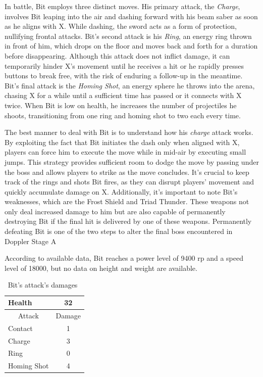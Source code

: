 In battle, Bit employs three distinct moves. His primary attack, the \emph{Charge}, involves Bit leaping into the air and dashing forward with his beam saber as soon as he aligns with X. While dashing, the sword acts as a form of protection, nullifying frontal attacks. Bit's second attack is his \emph{Ring}, an energy ring thrown in front of him, which drops on the floor and moves back and forth for a duration before disappearing. Although this attack does not inflict damage, it can temporarily hinder X's movement until he receives a hit or he rapidly presses buttons to break free, with the risk of enduring a follow-up in the meantime. Bit's final attack is the \emph{Homing Shot}, an energy sphere he throws into the arena, chasing X for a while until a sufficient time has passed or it connects with X twice. When Bit is low on health, he increases the number of projectiles he shoots, transitioning from one ring and homing shot to two each every time.


The best manner to deal with Bit is to understand how his \emph{charge} attack works. By exploiting the fact that Bit initiates the dash only when aligned with X, players can force him to execute the move while in mid-air by executing small jumps. This strategy provides sufficient room to dodge the move by passing under the boss and allows players to strike as the move concludes. It's crucial to keep track of the rings and shots Bit fires, as they can disrupt players' movement and quickly accumulate damage on X. Additionally, it's important to note Bit's weaknesses, which are the Frost Shield and Triad Thunder. These weapons not only deal increased damage to him but are also capable of permanently destroying Bit if the final hit is delivered by one of these weapons. Permanently defeating Bit is one of the two steps to alter the final boss encountered in Doppler Stage A

According to available data, Bit reaches a power level of 9400 rp and a speed level of 18000, but no data on height and weight are available.

\begin{table}[htp]
	\centering
	\begin{tabular}[h]{l c}
		\toprule
		Health  & 32\\
		\midrule
		\multicolumn{1}{c}{Attack} & \multicolumn{1}{c}{Damage}\\
		Contact & 1\\
		Charge& 3\\
		Ring& 0\\
		Homing Shot& 4\\
		\bottomrule
	\end{tabular}
	\caption{Bit's attack's damages~\cite{wiki:Bit,book:Compendium}}
\end{table} 


